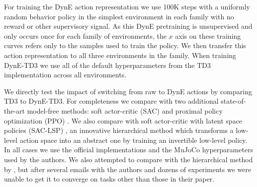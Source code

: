 
For training the DynE action representation we use 100K steps with a uniformly random behavior policy in the simplest environment in each family with no reward or other supervisory signal.
As this DynE pretraining is unsupervised and only occurs once for each family of environments, the $x$ axis on these training curves refers only to the samples used to train the policy.
We then transfer this action representation to all three environments in the family.
When training DynE-TD3 we use all of the default hyperparameters from the TD3 implementation across all environments.

We directly test the impact of switching from raw to DynE actions by comparing TD3 to DynE-TD3.
For completeness we compare with two additional state-of-the-art model-free methods: soft actor-critic (SAC) \citep{haarnoja2018soft,haarnoja2018softapp} and proximal policy optimization (PPO) \citep{schulman2017proximal}.
We also compare with soft actor-critic with latent space policies (SAC-LSP) \citep{haarnoja2018latent}, an innovative hierarchical method which transforms a low-level action space into an abstract one by training an invertible low-level policy.
In all cases we use the official implementations
and the MuJoCo hyperparameters used by the authors.
We also attempted to compare with the hierarchical method by \citet{Nachum2018NearOptimalRL}, but after several emails with the authors and dozens of experiments we were unable to get it to converge on tasks other than those in their paper.

